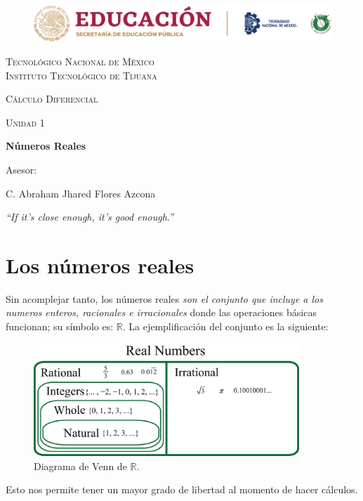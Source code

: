 \documentclass[letterpaper, 12pt]{article}
\begin{document}
    
    \begin{titlepage}
        \begin{figure}[ht]
            \centering
            \includegraphics[width=15cm]{logosITT.png}
        \end{figure}
        \centering
        {\scshape\LARGE Tecnológico Nacional de México\\Instituto Tecnológico de Tijuana\par}
        \vspace{1cm}
        {\scshape\Large Cálculo Diferencial\par}
        \vspace{1cm}
        {\scshape\Large Unidad 1\par}
        \vspace{1.5cm}
        {\huge\bfseries Números Reales\par}
        \vfill
        Asesor: \par
        C. Abraham Jhared Flores Azcona
        
        \vfill

        {\large \emph{``If it's close enough, it's good enough.''}}


    \end{titlepage}

    \newpage
        \pagestyle{empty}
        \tableofcontents
        \listoffigures

        \newpage
        \pagestyle{fancy}
        \section{Los números reales}
        Sin acomplejar tanto, los números reales \emph{son el conjunto que incluye a los numeros enteros, racionales e irracionales} donde las operaciones básicas funcionan; su símbolo es: \(\mathbb{R}\). La ejemplificación del conjunto es la siguiente:
        \begin{figure}[H]
            \centering
            \includegraphics[width=10cm]{R.jpg}
            \caption{Diagrama de Venn de \(\mathbb{R}\).}
            \label{fig:R}
        \end{figure}
        Esto nos permite tener un mayor grado de libertad al momento de hacer cálculos.
\end{document}
